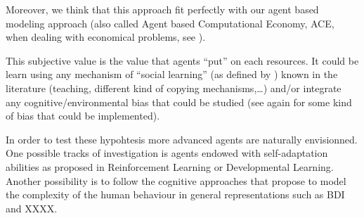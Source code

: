 \documentclass{wscpaperproc}
\begin{document}
Moreover, we think that this approach fit perfectly with our agent based modeling approach (also called Agent based Computational Economy, ACE, when dealing with economical problems, see
\cite{tesfatsion_introduction_2001}).


This subjective value is the value that agents ``put'' on each resources. It could be learn using any mechanism of ``social learning'' (as defined by \cite{lycett_cultural_2015}) known in the literature (teaching, different kind of copying mechanisms,\ldots) and/or integrate any cognitive/environmental bias that could be studied (see again \cite{lycett_cultural_2015} for some kind of bias that could be implemented).

In order to test these hypohtesis more advanced agents are naturally envisionned. One possible tracks of investigation is agents endowed with self-adaptation abilities as proposed in Reinforcement Learning or Developmental Learning. Another possibility is to follow the cognitive approaches that propose to model the complexity of the human behaviour in general representations such as BDI and XXXX.



  
\end{document}
